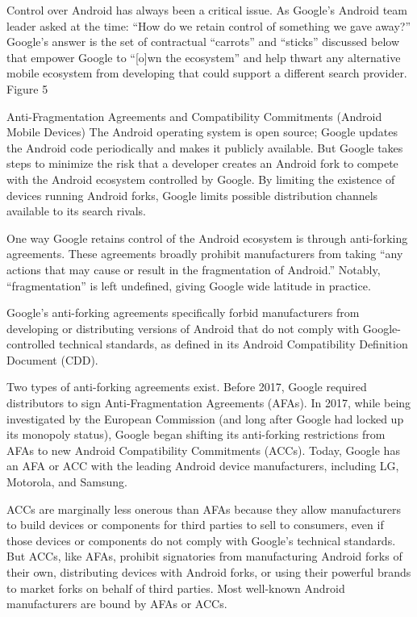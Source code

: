 \documentclass[11pt,b5paper]{scrartcl}
\begin{document}

Control over Android has always been a critical issue. As Google’s Android team
leader asked at the time: “How do we retain control of something we gave away?” Google’s
answer is the set of contractual “carrots” and “sticks” discussed below that empower Google to
“[o]wn the ecosystem” and help thwart any alternative mobile ecosystem from developing that
could support a different search provider.
Figure 5




Anti-Fragmentation Agreements and Compatibility Commitments
(Android Mobile Devices)
The Android operating system is open source; Google updates the Android code
periodically and makes it publicly available. But Google takes steps to minimize the risk that a
developer creates an Android fork to compete with the Android ecosystem controlled by Google.
By limiting the existence of devices running Android forks, Google limits possible distribution
channels available to its search rivals.


One way Google retains control of the Android ecosystem is through anti-forking
agreements. These agreements broadly prohibit manufacturers from taking “any actions that may
cause or result in the fragmentation of Android.” Notably, “fragmentation” is left undefined,
giving Google wide latitude in practice.


Google’s anti-forking agreements specifically forbid manufacturers from
developing or distributing versions of Android that do not comply with Google-controlled
technical standards, as defined in its Android Compatibility Definition Document (CDD).


Two types of anti-forking agreements exist. Before 2017, Google required
distributors to sign Anti-Fragmentation Agreements (AFAs). In 2017, while being investigated
by the European Commission (and long after Google had locked up its monopoly status), Google
began shifting its anti-forking restrictions from AFAs to new Android Compatibility
Commitments (ACCs). Today, Google has an AFA or ACC with the leading Android device
manufacturers, including LG, Motorola, and Samsung.


ACCs are marginally less onerous than AFAs because they allow manufacturers
to build devices or components for third parties to sell to consumers, even if those devices or
components do not comply with Google’s technical standards. But ACCs, like AFAs, prohibit
signatories from manufacturing Android forks of their own, distributing devices with Android
forks, or using their powerful brands to market forks on behalf of third parties. Most well-known
Android manufacturers are bound by AFAs or ACCs.
\end{document}
